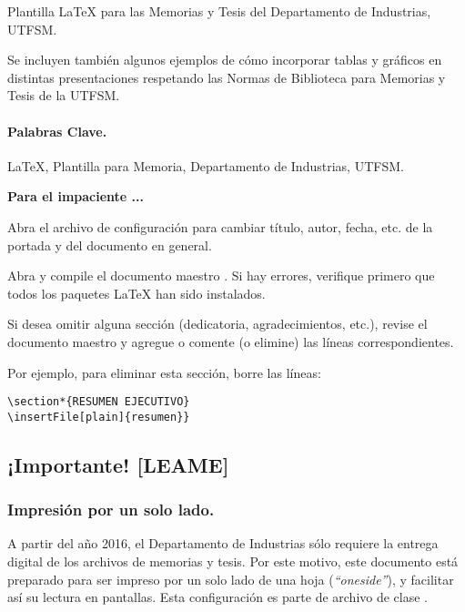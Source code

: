 
Plantilla \LaTeX{} para las Memorias y Tesis del Departamento de Industrias, UTFSM.

Se incluyen también algunos ejemplos de cómo incorporar tablas y gráficos en distintas presentaciones respetando las Normas de Biblioteca para Memorias y Tesis de la UTFSM.

\vspace{20mm}

\paragraph{Palabras Clave.}
\LaTeX{}, Plantilla para Memoria, Departamento de Industrias, UTFSM.

\vspace{10mm}

\begin{framed}
\noindent\textbf{\color{red}Para el impaciente ...}

Abra el archivo de configuración  para cambiar título, autor, fecha, etc. de la portada y del documento en general.

Abra  y compile el documento maestro . Si hay errores, verifique primero que todos los paquetes \LaTeX{} han sido instalados.

Si desea omitir alguna sección (dedicatoria, agradecimientos, etc.), revise el documento maestro  y agregue o comente (o elimine) las líneas correspondientes.

Por ejemplo, para eliminar esta sección, borre las líneas:

\begin{Verbatim}[frame=lines, label=\inlinecode{memoria.tex} (extracto)
, fontsize=\footnotesize
, baselinestretch=1
, formatcom=\color{gray}]
\section*{RESUMEN EJECUTIVO}
\insertFile[plain]{resumen}}
\end{Verbatim}
\end{framed}

\newpage
\subsection*{¡Importante! [LEAME]}

\subsubsection*{Impresión por un solo lado.}
A partir del año 2016, el Departamento de Industrias sólo requiere la entrega digital de los archivos de memorias y tesis. Por este motivo, este documento está preparado para ser impreso por un solo lado de una hoja (\emph{``oneside''}), y facilitar así su lectura en pantallas. Esta configuración es parte de archivo de clase .

